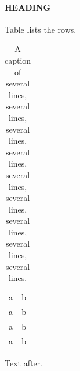 \documentclass[a4paper]{memoir}
\begin{document}

\paragraph*{HEADING}\label{a}
Table lists the rows.
\begin{longtable}{ll}
\caption{A caption of several lines, several lines, several lines, several
  lines, several lines, several lines, several lines, several lines, several
  lines.}\label{t}\\
a & b\\ a & b\\ a & b\\ a & b\\
\end{longtable}
Text after.
\end{document}
